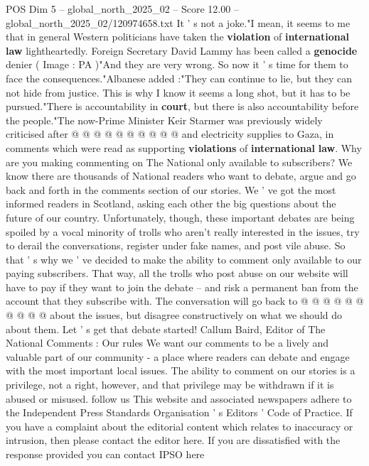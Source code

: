 \begin{textsample}{POS Dim 5 – global\_north\_2025\_02 – Score 12.00 – global\_north\_2025\_02/120974658.txt}
It ' s not a joke."I mean, it seems to me that in general Western politicians have taken the \textbf{violation} of \textbf{international} \textbf{law} lightheartedly.
Foreign Secretary David Lammy has been called a \textbf{genocide} denier ( Image : PA )"And they are very wrong.
So now it ' s time for them to face the consequences."Albanese added :"They can continue to lie, but they can not hide from justice.
This is why I know it seems a long shot, but it has to be pursued."There is accountability in \textbf{court}, but there is also accountability before the people."The now-Prime Minister Keir Starmer was previously widely criticised after @ @ @ @ @ @ @ @ @ @ and electricity supplies to Gaza, in comments which were read as supporting \textbf{violations} of \textbf{international} \textbf{law}.
Why are you making commenting on The National only available to subscribers?
We know there are thousands of National readers who want to debate, argue and go back and forth in the comments section of our stories.
We ' ve got the most informed readers in Scotland, asking each other the big questions about the future of our country.
Unfortunately, though, these important debates are being spoiled by a vocal minority of trolls who aren't really interested in the issues, try to derail the conversations, register under fake names, and post vile abuse.
So that ' s why we ' ve decided to make the ability to comment only available to our paying subscribers.
That way, all the trolls who post abuse on our website will have to pay if they want to join the debate -- and risk a permanent ban from the account that they subscribe with.
The conversation will go back to @ @ @ @ @ @ @ @ @ @ about the issues, but disagree constructively on what we should do about them.
Let ' s get that debate started!
Callum Baird, Editor of The National Comments : Our rules We want our comments to be a lively and valuable part of our community - a place where readers can debate and engage with the most important local issues.
The ability to comment on our stories is a privilege, not a right, however, and that privilege may be withdrawn if it is abused or misused. follow us This website and associated newspapers adhere to the Independent Press Standards Organisation ' s Editors ' Code of Practice.
If you have a complaint about the editorial content which relates to inaccuracy or intrusion, then please contact the editor here.
If you are dissatisfied with the response provided you can contact IPSO here

\end{textsample}
